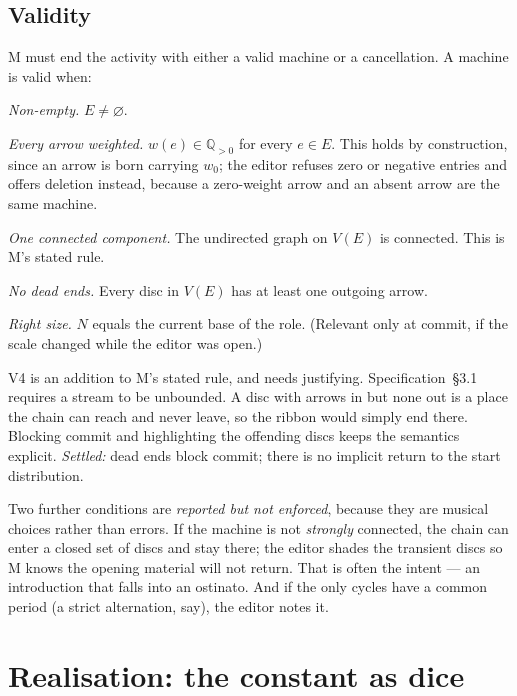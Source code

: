 \documentclass[11pt,a4paper]{article}
\theoremstyle{definition}
\theoremstyle{plain}
\theoremstyle{remark}
\begin{document}
\subsection{Validity}
\label{sec:validity}

M must end the activity with either a valid machine or a cancellation. A machine is valid when:

\begin{description}[leftmargin=1.1cm,style=sameline,itemsep=3pt]
\item[\textbf{V1}] \emph{Non-empty.} $E\neq\varnothing$.
\item[\textbf{V2}] \emph{Every arrow weighted.} $w(e)\in\mathbb{Q}_{>0}$ for every $e\in E$. This
  holds by construction, since an arrow is born carrying $w_0$; the editor refuses zero or negative
  entries and offers deletion instead, because a zero-weight arrow and an absent arrow are the same
  machine.
\item[\textbf{V3}] \emph{One connected component.} The undirected graph on $V(E)$ is connected. This
  is M's stated rule.
\item[\textbf{V4}] \emph{No dead ends.} Every disc in $V(E)$ has at least one outgoing arrow.
\item[\textbf{V5}] \emph{Right size.} $N$ equals the current base of the role. (Relevant only at
  commit, if the scale changed while the editor was open.)
\end{description}

V4 is an addition to M's stated rule, and needs justifying. Specification~\S3.1 requires a stream
to be unbounded. A disc with arrows in but none out is a place the chain can reach and never leave,
so the ribbon would simply end there. Blocking commit and highlighting the offending discs keeps the
semantics explicit. \emph{Settled:} dead ends block commit; there is no implicit return to the
start distribution.

Two further conditions are \emph{reported but not enforced}, because they are musical choices rather
than errors. If the machine is not \emph{strongly} connected, the chain can enter a closed set of
discs and stay there; the editor shades the transient discs so M knows the opening material will not
return. That is often the intent --- an introduction that falls into an ostinato. And if the only
cycles have a common period (a strict alternation, say), the editor notes it.

\section{Realisation: the constant as dice}
\label{sec:realisation}
\end{document}

